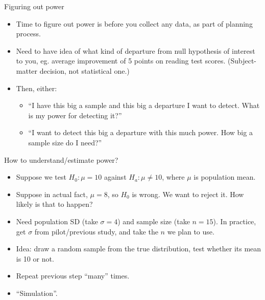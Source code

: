 \documentclass[ignorenonframetext,]{beamer}
\providecommand{\tightlist}{%
  \setlength{\itemsep}{0pt}\setlength{\parskip}{0pt}}
\begin{document}
\begin{frame}{Figuring out power}
\protect\hypertarget{figuring-out-power}{}

\begin{itemize}
\tightlist
\item
  Time to figure out power is before you collect any data, as part of
  planning process.
\item
  Need to have idea of what kind of departure from null hypothesis of
  interest to you, eg. average improvement of 5 points on reading test
  scores. (Subject-matter decision, not statistical one.)
\item
  Then, either:

  \begin{itemize}
  \tightlist
  \item
    ``I have this big a sample and this big a departure I want to
    detect. What is my power for detecting it?''
  \item
    ``I want to detect this big a departure with this much power. How
    big a sample size do I need?''
  \end{itemize}
\end{itemize}

\end{frame}

\begin{frame}{How to understand/estimate power?}
\protect\hypertarget{how-to-understandestimate-power}{}

\begin{itemize}
\tightlist
\item
  Suppose we test \(H_0 : \mu = 10\) against \(H_a : \mu \ne 10\), where
  \(\mu\) is population mean.
\item
  Suppose in actual fact, \(\mu = 8\), so \(H_0\) is wrong. We want to
  reject it. How likely is that to happen?
\item
  Need population SD (take \(\sigma = 4\)) and sample size (take
  \(n = 15\)). In practice, get \(\sigma\) from pilot/previous study,
  and take the \(n\) we plan to use.
\item
  Idea: draw a random sample from the true distribution, test whether
  its mean is 10 or not.
\item
  Repeat previous step ``many'' times.
\item
  ``Simulation''.
\end{itemize}

\end{frame}
\end{document}

